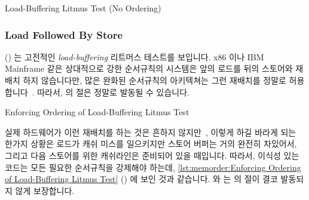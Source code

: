 \fi

\begin{listing}[tbp]

\caption{Load-Buffering Litmus Test (No Ordering)}
\label{lst:memorder:Load-Buffering Litmus Test (No Ordering)}
\end{listing}

\subsubsection{Load Followed By Store}
\label{sec:memorder:Load Followed By Store}

\begin{fcvref}
()
는 고전적인 \emph{load-buffering} 리트머스 테스트를 보입니다.
x86 이나 IBM Mainframe 같은 상대적으로 강한 순서규칙의 시스템은 앞의 로드를
뒤의 스토어와 재배치 하지 않습니다만, 많은 완화된 순서규칙의 아키텍쳐는 그런
재배치를 정말로 허용합니다~\cite{JadeAlglave2011ppcmem}.
따라서,  의  절은 정말로 발동될 수 있습니다.
\end{fcvref}

\begin{listing}[tbp]

\caption{Enforcing Ordering of Load-Buffering Litmus Test}
\label{lst:memorder:Enforcing Ordering of Load-Buffering Litmus Test}
\end{listing}

\begin{fcvref}
실제 하드웨어가 이런 재배치를 하는 것은 흔하지
않지만~\cite{LucMaranget2017aarch64}, 이렇게 하길 바라게 되는 한가지 상황은
로드가 캐쉬 미스를 일으키지만 스토어 버퍼는 거의 완전히 차있어서, 그리고 다음
스토어를 위한 캐쉬라인은 준비되어 있을 때입니다.
따라서, 이식성 있는 코드는 모든 필요한 순서규칙을 강제해야 하는데,
\cref{lst:memorder:Enforcing Ordering of Load-Buffering Litmus Test}
() 에 보인 것과 같습니다.
 와  는  의
 절이 결코 발동되지 않게 보장합니다.
\end{fcvref}

